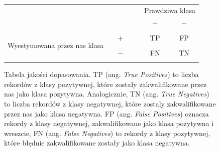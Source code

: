 \documentclass{mini}
\begin{document}
\begin{figure}[h]
		\begin{center}
		\begin{tabular}{c c c c | | c c c} 
			& & & & & \multicolumn{2}{c}{ Prawdziwa klasa}\\ 
			& & & & & $+$ & $-$ \\
			\hline
			\hline
			& & & & & & \\
			\multirow{3}{*}{\parbox{4cm}{\centering  Wyestymowana przez nas klasa}}
			& & $+$ & & & TP & FP\\
			& & & & &\\
			& & $-$ & & & FN & TN\\
			& & & & & &
		\end{tabular}
		\end{center}
	\caption{Tabela jakości dopasowania. TP (ang. \textit{True Positives}) to liczba rekordów z klasy pozytywnej, które zostały zakwalifikowane przez nas jako klasa pozytywna. Analogicznie, TN (ang. \textit{True Negatives}) to liczba rekordów z klasy negatywnej, które zostaly zakwalifikowane przez nas jako klasa negatywna. FP (ang. \textit{False Positives}) oznacza rekordy z klasy negatywnej, zakwalifikowane jako klasa pozytywna i wreszcie, FN (ang. \textit{False Negatives}) to rekordy z klasy pozytywnej, które błędnie zakwalifikowane zostały jako klasa negatywna.}
\label{tabeladopasowania}	
\end{figure}
\newpage
\vfill
\end{document}
